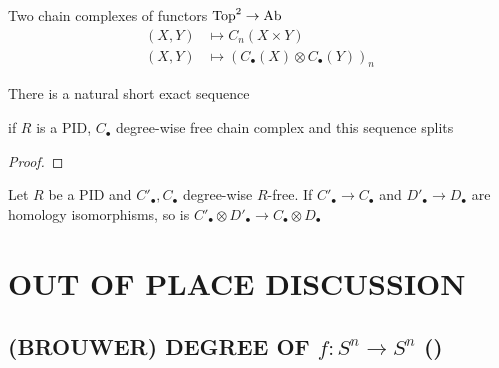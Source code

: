 \documentclass{report}
\begin{document}

\begin{remark}
    Two chain complexes of functors $\operatorname{Top}^2 \to \operatorname{Ab}$
    \begin{align*}
        (X, Y) &\mapsto C_n(X \times Y) \\
        (X, Y) &\mapsto (C_\bullet(X) \otimes C_\bullet(Y))_n
    \end{align*}
\end{remark}

\begin{theorem}
    There is a natural short exact sequence
    \begin{center}
    \end{center}
    if $R$ is a PID, $C_\bullet$ degree-wise free chain complex and this sequence splits
\end{theorem}

\begin{proof}
\end{proof}

\begin{corollary}
    Let $R$ be a PID and $C'_\bullet, C_\bullet$ degree-wise $R$-free. If $C'_\bullet \to C_\bullet$ and $D'_\bullet \to D_\bullet$ are homology isomorphisms, so is $C'_\bullet \otimes D'_\bullet \to C_\bullet \otimes D_\bullet$
\end{corollary}


\chapter{OUT OF PLACE DISCUSSION}

\section{(BROUWER) DEGREE OF $f: S^n \to S^n$ ()}
\end{document}
